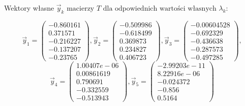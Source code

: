 Wektory własne $\vec{y}_k \text{ macierzy } T \text{ dla odpowiednich wartości własnych } \lambda_k $:

\begin{equation*}
\vec{y}_1 = 
\begin{pmatrix}
-0.860161 \\ 0.371571 \\ -0.216227\\ -0.137207\\ -0.23765
\end{pmatrix} ,
\vec{y}_2 = 
\begin{pmatrix}
-0.509986 \\ -0.618499 \\ 0.369873\\ 0.234827\\ 0.406723
\end{pmatrix} ,
\vec{y}_3 = 
\begin{pmatrix}
-0.00604528 \\ -0.692329 \\ -0.436638\\-0.287573\\ -0.497285
\end{pmatrix} ,
\end{equation*}
\begin{equation*}
\vec{y}_4 = 
\begin{pmatrix}
1.00407e-06 \\ 0.00861619 \\ 0.790691\\-0.332559\\ -0.513943
\end{pmatrix},
\vec{y}_5 = 
\begin{pmatrix}
-2.99203e-11 \\8.22916e-06 \\-0.024372 \\-0.856 \\0.5164 
\end{pmatrix} 
\end{equation*}

